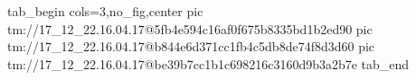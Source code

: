  
 
 
 
 

\qqSecOrig


\ifcmt
  tab_begin cols=3,no_fig,center
    pic tm://17_12_22.16.04.17@5fb4e594c16af0f675b8335bd1b2ed90
    pic tm://17_12_22.16.04.17@b844e6d371cc1fb4c5db8de74f8d3d60
    pic tm://17_12_22.16.04.17@be39b7cc1b1c698216c3160d9b3a2b7e
  tab_end
\fi

